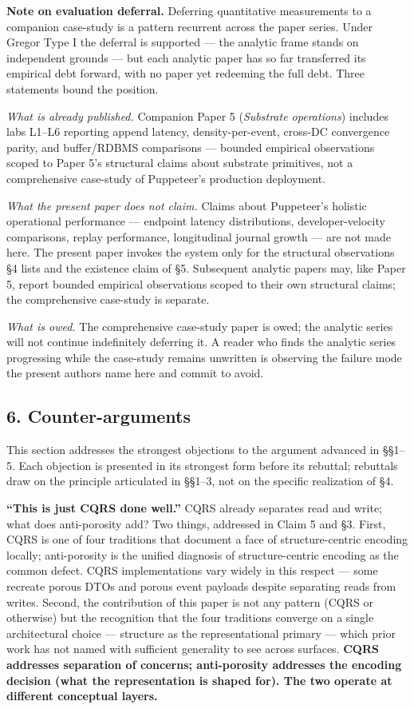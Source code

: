\documentclass[
]{article}
\begin{document}
\textbf{Note on evaluation deferral.} Deferring quantitative
measurements to a companion case-study is a pattern recurrent across the
paper series. Under Gregor Type I the deferral is supported --- the
analytic frame stands on independent grounds --- but each analytic paper
has so far transferred its empirical debt forward, with no paper yet
redeeming the full debt. Three statements bound the position.

\emph{What is already published.} Companion Paper 5 (\emph{Substrate
operations}) includes labs L1--L6 reporting append latency,
density-per-event, cross-DC convergence parity, and buffer/RDBMS
comparisons --- bounded empirical observations scoped to Paper 5's
structural claims about substrate primitives, not a comprehensive
case-study of Puppeteer's production deployment.

\emph{What the present paper does not claim.} Claims about Puppeteer's
holistic operational performance --- endpoint latency distributions,
developer-velocity comparisons, replay performance, longitudinal journal
growth --- are not made here. The present paper invokes the system only
for the structural observations §4 lists and the existence claim of §5.
Subsequent analytic papers may, like Paper 5, report bounded empirical
observations scoped to their own structural claims; the comprehensive
case-study is separate.

\emph{What is owed.} The comprehensive case-study paper is owed; the
analytic series will not continue indefinitely deferring it. A reader
who finds the analytic series progressing while the case-study remains
unwritten is observing the failure mode the present authors name here
and commit to avoid.

\subsection{6. Counter-arguments}\label{counter-arguments}

This section addresses the strongest objections to the argument advanced
in §§1--5. Each objection is presented in its strongest form before its
rebuttal; rebuttals draw on the principle articulated in §§1--3, not on
the specific realization of §4.

\textbf{``This is just CQRS done well.''} CQRS already separates read
and write; what does anti-porosity add? Two things, addressed in Claim 5
and §3. First, CQRS is one of four traditions that document a face of
structure-centric encoding locally; anti-porosity is the unified
diagnosis of structure-centric encoding as the common defect. CQRS
implementations vary widely in this respect --- some recreate porous
DTOs and porous event payloads despite separating reads from writes.
Second, the contribution of this paper is not any pattern (CQRS or
otherwise) but the recognition that the four traditions converge on a
single architectural choice --- structure as the representational
primary --- which prior work has not named with sufficient generality to
see across surfaces. \textbf{CQRS addresses separation of concerns;
anti-porosity addresses the encoding decision (what the representation
is shaped for). The two operate at different conceptual layers.}
\end{document}
